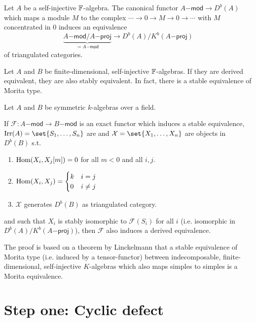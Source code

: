 \documentclass[fontsize=11pt,fleqn,a4paper]{scrartcl}
\begin{document}
\begin{theorem}[Rickard]
Let $A$ be a self-injective $\mathbb{F}$-algebra. The canonical functor $A\mathsf{-mod} \to D^b(A)$ which maps a module $M$ to the complex $\cdots\to0\to M\to 0\to\cdots$ with $M$ concentrated in $0$ induces an equivalence
\[\underbrace{A\mathsf{-mod}/A\mathsf{-proj}}_{=A\mathsf{-\underline{mod}}} \to D^b(A) / K^b(A\mathsf{-proj})\]
of triangulated categories.
\end{theorem}

\begin{corollary}
Let $A$ and $B$ be finite-dimensional, self-injective $\mathbb{F}$-algebras. If they are derived equivalent, they are also stably equivalent. In fact, there is a stable equivalence of Morita type.
\end{corollary}

\begin{theorem}
Let $A$ and $B$ be symmetric $k$-algebras over a field.

If $\mathcal{F}: A\mathsf{-mod}\to B\mathsf{-mod}$ is an exact functor which induces a stable equivalence, $\Irr(A)=\set{S_1,\ldots,S_n}$ are and $\mathcal{X}=\set{X_1,\ldots,X_n}$ are objects in $D^b(B)$ s.t.
\begin{enumerate}
\item $\operatorname{Hom}(X_i,X_j[m]) = 0$ for all $m<0$ and all $i,j$.
\item $\operatorname{Hom}(X_i,X_j) = \begin{cases} k & i=j \\ 0 & i\neq j\end{cases}$
\item $\mathcal{X}$ generates $D^b(B)$ as triangulated category.
\end{enumerate}
and such that $X_i$ is stably isomorphic to $\mathcal{F}(S_i)$ for all $i$ (i.e. isomorphic in $D^b(A)/K^b(A\mathsf{-proj})$), then $\mathcal{F}$ also induces a derived equivalence.
\end{theorem}

\begin{remark}
The proof is based on a theorem by Linckelmann that a stable equivalence of Morita type (i.e. induced by a tensor-functor) between indecomposable, finite-dimensional, self-injective $K$-algebras which also maps simples to simples is a Morita equivalence.
\end{remark}

\section{Step one: Cyclic defect}
\end{document}
